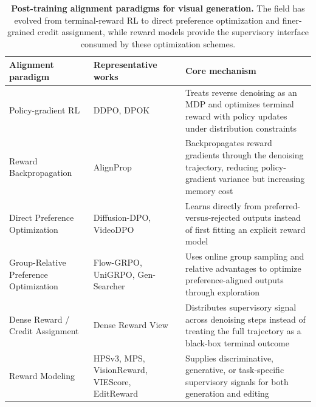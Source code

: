 \begin{table}[t]
\centering
\caption{\textbf{Post-training alignment paradigms for visual generation.} The field has evolved from terminal-reward RL to direct preference optimization and finer-grained credit assignment, while reward models provide the supervisory interface consumed by these optimization schemes.}
\label{tab:posttrain_summary}
\footnotesize
\setlength{\tabcolsep}{4pt}
\renewcommand{\arraystretch}{1.16}
\begin{tabularx}{\textwidth}{@{}>{\raggedright\arraybackslash}p{3.2cm}>{\raggedright\arraybackslash}p{3.4cm}>{\raggedright\arraybackslash}X@{}}
\toprule
\textbf{Alignment paradigm} & \textbf{Representative works} & \textbf{Core mechanism} \\
\midrule
Policy-gradient RL & DDPO, DPOK & Treats reverse denoising as an MDP and optimizes terminal reward with policy updates under distribution constraints \\
Reward Backpropagation & AlignProp & Backpropagates reward gradients through the denoising trajectory, reducing policy-gradient variance but increasing memory cost \\
Direct Preference Optimization & Diffusion-DPO, VideoDPO & Learns directly from preferred-versus-rejected outputs instead of first fitting an explicit reward model \\
Group-Relative Preference Optimization & Flow-GRPO, UniGRPO, Gen-Searcher & Uses online group sampling and relative advantages to optimize preference-aligned outputs through exploration \\
Dense Reward / Credit Assignment & Dense Reward View & Distributes supervisory signal across denoising steps instead of treating the full trajectory as a black-box terminal outcome \\
Reward Modeling & HPSv3, MPS, VisionReward, VIEScore, EditReward & Supplies discriminative, generative, or task-specific supervisory signals for both generation and editing \\
\bottomrule
\end{tabularx}
\end{table}

